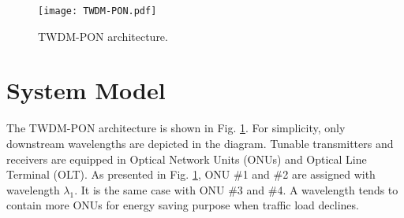 \documentclass[letter]{IEEEtran}
\begin{document}
%



\begin{figure}
	\centering
	\texttt{[image: TWDM-PON.pdf]}\\
	\caption{TWDM-PON architecture.}
	\label{architecture}
	\vspace{-6.0mm}
\end{figure}
\vspace{-3.0mm}

\section{System Model}
The TWDM-PON architecture is shown in Fig. \ref{architecture}. For simplicity, only downstream wavelengths are depicted in the diagram. Tunable transmitters and receivers are equipped in Optical Network Units (ONUs) and Optical Line Terminal (OLT). As presented in Fig. \ref{architecture}, ONU \#1 and \#2 are assigned with wavelength $\lambda_{1}$. It is the same case with ONU \#3 and \#4. A wavelength tends to contain more ONUs for energy saving purpose when traffic load declines.
\end{document}
